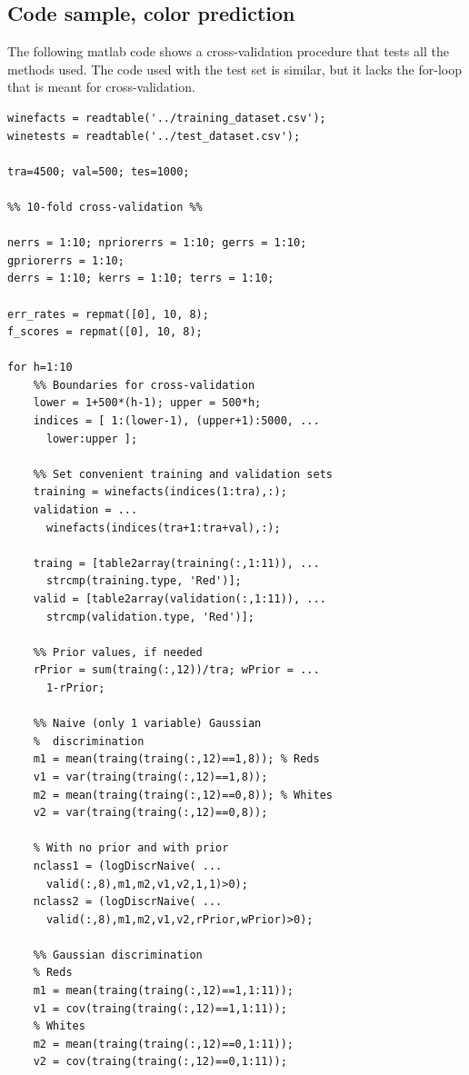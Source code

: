 \documentclass[twoside]{article}
\begin{document}
\begin{multicols}{2}
\section{Code sample, color prediction}\label{appendix:colorcode}

The following matlab code shows a cross-validation procedure
that tests all the methods used. The code used with the test
set is similar, but it lacks the for-loop that is meant for 
cross-validation.

{\footnotesize

\begin{verbatim}
winefacts = readtable('../training_dataset.csv');
winetests = readtable('../test_dataset.csv');

tra=4500; val=500; tes=1000;

%% 10-fold cross-validation %%

nerrs = 1:10; npriorerrs = 1:10; gerrs = 1:10; 
gpriorerrs = 1:10;
derrs = 1:10; kerrs = 1:10; terrs = 1:10;

err_rates = repmat([0], 10, 8); 
f_scores = repmat([0], 10, 8); 

for h=1:10
    %% Boundaries for cross-validation
    lower = 1+500*(h-1); upper = 500*h;
    indices = [ 1:(lower-1), (upper+1):5000, ...
      lower:upper ];

    %% Set convenient training and validation sets
    training = winefacts(indices(1:tra),:);
    validation = ...
      winefacts(indices(tra+1:tra+val),:);

    traing = [table2array(training(:,1:11)), ... 
      strcmp(training.type, 'Red')];
    valid = [table2array(validation(:,1:11)), ... 
      strcmp(validation.type, 'Red')];

    %% Prior values, if needed
    rPrior = sum(traing(:,12))/tra; wPrior = ...
      1-rPrior;

    %% Naive (only 1 variable) Gaussian 
    %  discrimination
    m1 = mean(traing(traing(:,12)==1,8)); % Reds
    v1 = var(traing(traing(:,12)==1,8));
    m2 = mean(traing(traing(:,12)==0,8)); % Whites
    v2 = var(traing(traing(:,12)==0,8));

    % With no prior and with prior
    nclass1 = (logDiscrNaive( ...
      valid(:,8),m1,m2,v1,v2,1,1)>0);
    nclass2 = (logDiscrNaive( ...
      valid(:,8),m1,m2,v1,v2,rPrior,wPrior)>0);

    %% Gaussian discrimination
    % Reds
    m1 = mean(traing(traing(:,12)==1,1:11)); 
    v1 = cov(traing(traing(:,12)==1,1:11));
    % Whites
    m2 = mean(traing(traing(:,12)==0,1:11)); 
    v2 = cov(traing(traing(:,12)==0,1:11));


\end{verbatim}}
\end{multicols}
\end{document}
